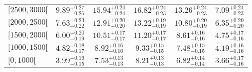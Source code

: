 \begin{tabular}{lccccc}
$[2500,3000[$ & $9.89^{+0.27}_{-0.26}$ & $15.94^{+0.24}_{-0.24}$ & $16.82^{+0.24}_{-0.23}$ & $13.26^{+0.24}_{-0.23}$ & $7.09^{+0.24}_{-0.23}$ \\
$[2000,2500[$ & $7.63^{+0.23}_{-0.22}$ & $12.91^{+0.20}_{-0.20}$ & $13.22^{+0.19}_{-0.19}$ & $10.80^{+0.20}_{-0.19}$ & $6.35^{+0.20}_{-0.20}$ \\
$[1500,2000[$ & $6.00^{+0.20}_{-0.19}$ & $10.51^{+0.17}_{-0.17}$ & $11.20^{+0.17}_{-0.17}$ & $8.61^{+0.16}_{-0.16}$ & $4.75^{+0.17}_{-0.16}$ \\
$[1000,1500[$ & $4.82^{+0.18}_{-0.17}$ & $8.92^{+0.16}_{-0.16}$ & $9.33^{+0.15}_{-0.15}$ & $7.48^{+0.15}_{-0.15}$ & $4.19^{+0.16}_{-0.16}$ \\
$[0,1000[$ & $3.99^{+0.16}_{-0.15}$ & $7.53^{+0.13}_{-0.13}$ & $8.21^{+0.13}_{-0.13}$ & $6.82^{+0.14}_{-0.14}$ & $3.66^{+0.17}_{-0.16}$ \\
\bottomrule\end{tabular}
